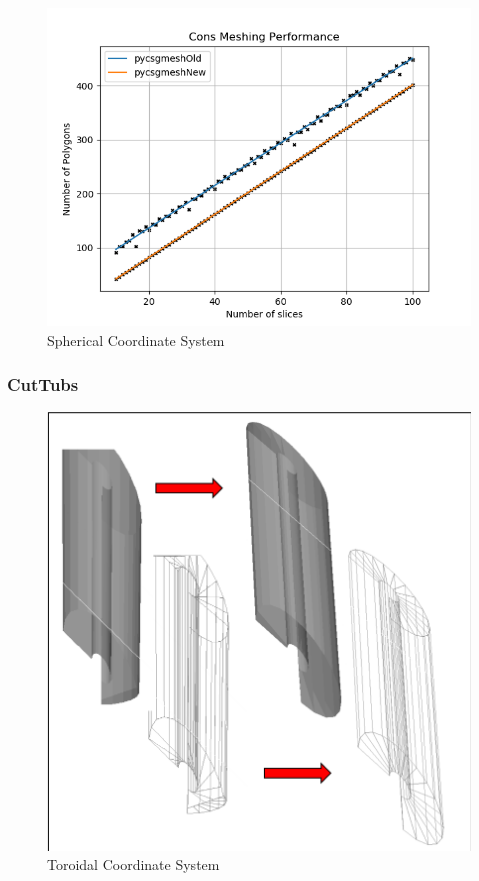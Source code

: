 \documentclass[12pt,a4paper]{article}
\begin{document}
\begin{figure}[h!]
\centering
\includegraphics[scale=0.5]{Images//Quad_fits//Cons_quad.png}
\caption[width=\columnwidth]{Spherical Coordinate System}
\label{conts}
\end{figure}

\newpage
\subsubsection{CutTubs}

\begin{figure}[h!]
\centering
\includegraphics[scale=0.5]{Images//Meshes//CutTubs.png}
\caption[width=\columnwidth]{Toroidal Coordinate System}
\label{conts}
\end{figure}
\end{document}
